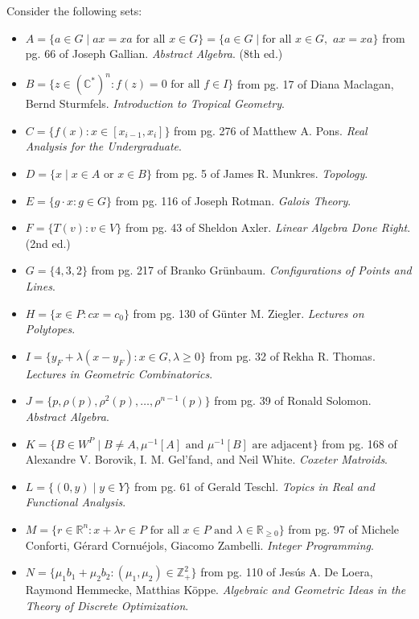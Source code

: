 \documentclass{book}
\theoremstyle{ekimcustom}
\begin{document}
Consider the following sets:
\begin{itemize}
\item $A = \{a \in G \mid ax = xa \text{ for all } x \in G\}= \{a \in G \mid \text{for all } x \in G,\,\, ax = xa \}$ from pg. 66 of Joseph Gallian. \emph{Abstract Algebra}. (8th ed.)
\item $B = \{z \in (\mathbb{C}^*)^n : f(z)=0 \text{ for all } f \in I\}$ from pg. 17 of Diana Maclagan, Bernd Sturmfels. \emph{Introduction to Tropical Geometry}.
\item $C = \{f(x) : x \in [x_{i-1}, x_i]\}$ from pg. 276 of Matthew A. Pons. \emph{Real Analysis for the Undergraduate}.
\item $D = \{x \mid x \in A \text{ or } x \in B\}$ from pg. 5 of James R. Munkres. \emph{Topology}.
\item $E = \{g \cdot x : g \in G\}$ from pg. 116 of Joseph Rotman. \emph{Galois Theory}.
\item $F = \{T(v) : v \in V\}$ from pg. 43 of Sheldon Axler. \emph{Linear Algebra Done Right}. (2nd ed.)
\item $G = \{4,3,2\}$ from pg. 217 of Branko Gr\"unbaum. \emph{Configurations of Points and Lines}.
\item $H = \{x \in P : cx=c_0\}$ from pg. 130 of G\"unter M. Ziegler. \emph{Lectures on Polytopes}.
\item $I = \{y_F + \lambda(x-y_F) : x \in G, \lambda \geq 0\}$ from pg. 32 of Rekha R. Thomas. \emph{Lectures in Geometric Combinatorics}.
\item $J = \{p, \rho(p), \rho^2(p),\dots, \rho^{n-1}(p)\}$ from pg. 39 of Ronald Solomon. \emph{Abstract Algebra}.
\item $K = \{B \in W^P \mid B \not= A, \mu^{-1}[A] \text{ and } \mu^{-1}[B] \text{ are adjacent}\}$ from pg. 168 of Alexandre V. Borovik, I. M. Gel'fand, and Neil White. \emph{Coxeter Matroids}.
\item $L = \{(0,y) \mid y \in Y\}$ from pg. 61 of Gerald Teschl. \emph{Topics in Real and Functional Analysis}.
\item $M = \{r \in \mathbb{R}^n : x+ \lambda r \in P \text{ for all } x \in P \text{ and } \lambda \in \mathbb{R}_{\geq 0}\}$ from pg. 97 of Michele Conforti, G\'erard Cornu\'ejols, Giacomo Zambelli. \emph{Integer Programming}.
\item $N = \{\mu_1b_1+\mu_2b_2 : (\mu_1,\mu_2) \in \mathbb{Z}^2_+\}$ from pg. 110 of Jes\'us A. De Loera, Raymond Hemmecke, Matthias K\"oppe. \emph{Algebraic and Geometric Ideas in the Theory of Discrete Optimization}.

\end{itemize}
\end{document}
